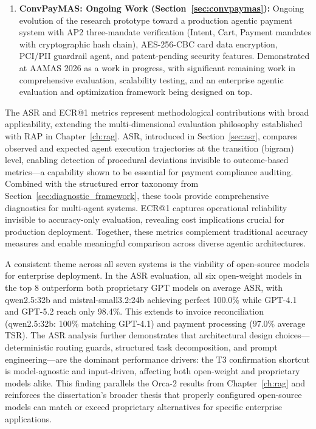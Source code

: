 \begin{enumerate}[leftmargin=*]
    \item \textbf{ConvPayMAS: Ongoing Work (Section~\ref{sec:convpaymas}):} Ongoing evolution of the research prototype toward a production agentic payment system with AP2 three-mandate verification (Intent, Cart, Payment mandates with cryptographic hash chain), AES-256-CBC card data encryption, PCI/PII guardrail agent, and patent-pending security features. Demonstrated at AAMAS 2026 as a work in progress, with significant remaining work in comprehensive evaluation, scalability testing, and an enterprise agentic evaluation and optimization framework being designed on top.
\end{enumerate}

The ASR and ECR@1 metrics represent methodological contributions with broad applicability, extending the multi-dimensional evaluation philosophy established with RAP in Chapter~\ref{ch:rag}. ASR, introduced in Section~\ref{sec:asr}, compares observed and expected agent execution trajectories at the transition (bigram) level, enabling detection of procedural deviations invisible to outcome-based metrics---a capability shown to be essential for payment compliance auditing. Combined with the structured error taxonomy from Section~\ref{sec:diagnostic_framework}, these tools provide comprehensive diagnostics for multi-agent systems. ECR@1 captures operational reliability invisible to accuracy-only evaluation, revealing cost implications crucial for production deployment. Together, these metrics complement traditional accuracy measures and enable meaningful comparison across diverse agentic architectures.

A consistent theme across all seven systems is the viability of open-source models for enterprise deployment. In the ASR evaluation, all six open-weight models in the top 8 outperform both proprietary GPT models on average ASR, with qwen2.5:32b and mistral-small3.2:24b achieving perfect 100.0\% while GPT-4.1 and GPT-5.2 reach only 98.4\%. This extends to invoice reconciliation (qwen2.5:32b: 100\% matching GPT-4.1) and payment processing (97.0\% average TSR). The ASR analysis further demonstrates that architectural design choices---deterministic routing guards, structured task decomposition, and prompt engineering---are the dominant performance drivers: the T3 confirmation shortcut is model-agnostic and input-driven, affecting both open-weight and proprietary models alike. This finding parallels the Orca-2 results from Chapter~\ref{ch:rag} and reinforces the dissertation's broader thesis that properly configured open-source models can match or exceed proprietary alternatives for specific enterprise applications.

